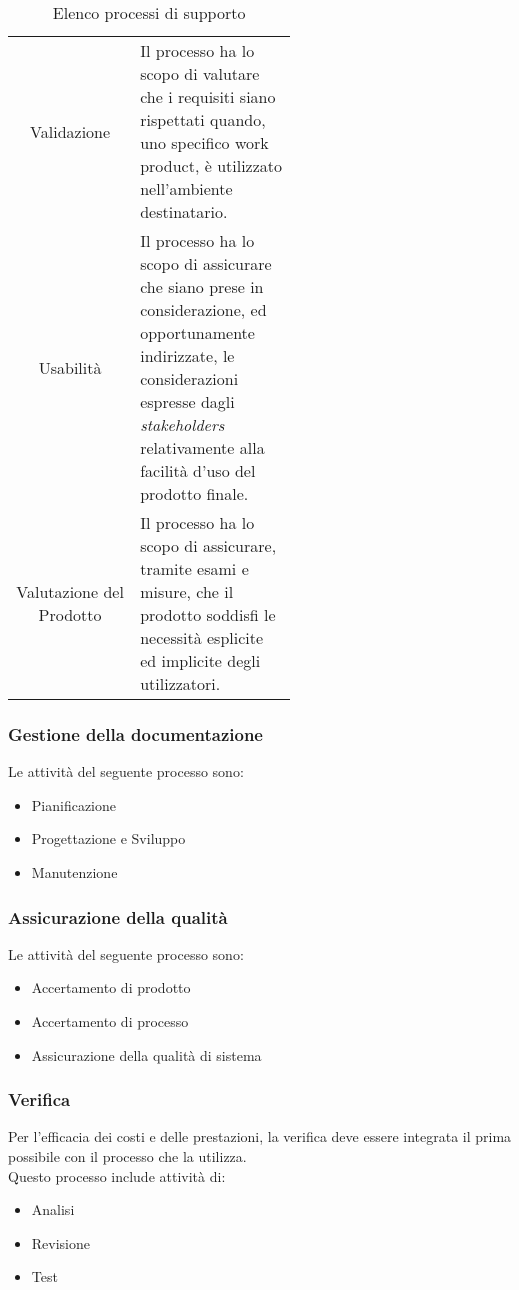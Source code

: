 \begin{table}[h!]
\begin{tabular}{c|p{0.56\linewidth}}
        \rowcolor[RGB]{233, 245, 206}
        Validazione
        & Il processo ha lo scopo di valutare che i requisiti siano rispettati quando,
        uno specifico work product, è utilizzato nell'ambiente destinatario. \\[4pt]
        \rowcolor[RGB]{216, 235, 171}
        Usabilità
        & Il processo ha lo scopo di assicurare che siano prese in considerazione, ed  opportunamente indirizzate, 
        le considerazioni espresse dagli \textit{stakeholders} relativamente alla facilità d'uso del prodotto finale. \\[4pt]
        \rowcolor[RGB]{233, 245, 206}
        Valutazione del Prodotto
        & Il processo ha lo scopo di assicurare, tramite esami e misure, che il prodotto soddisfi le necessità esplicite 
        ed implicite degli utilizzatori.  \\[4pt]
    \end{tabular}
    \caption{Elenco processi di supporto}
\end{table}

\subsubsection{Gestione della documentazione}
Le attività del seguente processo sono:
\begin{itemize}
    \item Pianificazione
    \item Progettazione e Sviluppo
    \item Manutenzione
\end{itemize}

\subsubsection{Assicurazione della qualità}
Le attività del seguente processo sono:
\begin{itemize}
    \item Accertamento di prodotto
    \item Accertamento di processo
    \item Assicurazione della qualità di sistema
\end{itemize}

\subsubsection{Verifica}
Per l'efficacia dei costi e delle prestazioni, la verifica deve essere integrata il prima possibile con il processo 
che la utilizza.\\ 
Questo processo include attività di:
\begin{itemize}
    \item Analisi
    \item Revisione
    \item Test
\end{itemize}

\setlength\extrarowheight{0pt}

